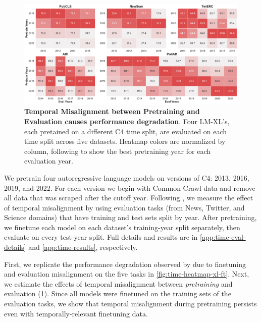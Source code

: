 \documentclass{article}
\newcommand{\bigLM}[0]{\textsc{LM-XL}}
\begin{document}
\begin{figure}[ht]
    \centering
    \includegraphics[width=0.99\linewidth]{fables/time/xl_time_pt_heatmap.pdf}
    \caption{
    \small
    \textbf{Temporal Misalignment between Pretraining and Evaluation causes performance degradation}. 
    Four \bigLM's, each pretained on a different C4 time split, are evaluated on each time split across five datasets.
    Heatmap colors are normalized by column, following \citet{luu2021time} to show the best pretraining year for each evaluation year.
    }
    \vspace{-3mm}
    \label{fig:time-heatmap-xl-pt}
\end{figure}

We pretrain four autoregressive language models on versions of C4: 2013, 2016, 2019, and 2022.
For each version we begin with Common Crawl data and remove all data that was scraped after the cutoff year.
Following \citet{luu2021time}, we measure the effect of temporal misalignment by using evaluation tasks (from News, Twitter, and Science domains) that have training and test sets split by year.
After pretraining, we finetune each model on each dataset's training-year split separately, then evaluate on every test-year split.
Full details and results are in \cref{app:time-eval-details} and \cref{app:time-results}, respectively.

First, we replicate the performance degradation observed by \citet{luu2021time} due to finetuning and evaluation misalignment on the five tasks in \cref{fig:time-heatmap-xl-ft}.
Next, we estimate the effects of temporal misalignment between \emph{pretraining} and evaluation (\cref{fig:time-heatmap-xl-pt}). 
Since all models were finetuned on the training sets of the evaluation tasks, we show that temporal misalignment during pretraining persists even with temporally-relevant finetuning data.
\end{document}

